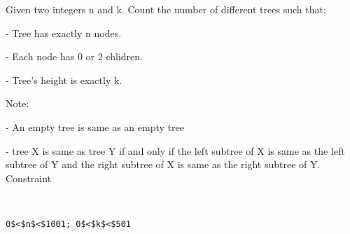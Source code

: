 Given two integers n and k. Count the number of different trees such that:  

   - Tree has exactly n nodes.  

   - Each node has 0 or 2 chlidren.  

   - Tree's height is exactly k.  

   Note:  

   - An empty tree is same as an empty tree  

   - tree X is same as tree Y if and only if the left subtree of X is same as the left subtree of Y and the right subtree of X is same as the right subtree of Y.
Constraint
\begin{verbatim}


0$<$n$<$1001; 0$<$k$<$501\end{verbatim}